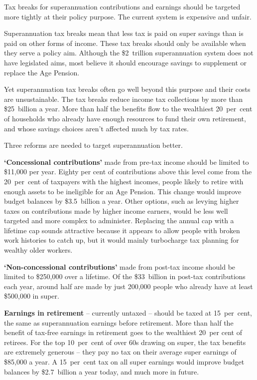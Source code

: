 

\setlength{\overviewextra}{2pt}
\addtolength{\columnsep}{\overviewextra}
\begin{overview}[-25pt]
\label{overview:SUPER}
Tax breaks for superannuation contributions and earnings should be targeted more tightly at their policy purpose. The current system is expensive and unfair. 

Superannuation tax breaks mean that less tax is paid on super savings than is paid on other forms of income. These tax breaks should only be available when they serve a policy aim. Although the \$2~trillion superannuation system does not have legislated aims, most believe it should encourage savings to supplement or replace the Age Pension. 

Yet superannuation tax breaks often go well beyond this purpose and their costs are unsustainable. The tax breaks reduce income tax collections by more than \$25~billion a year. More than half the benefits flow to the wealthiest 20~per~cent of households who already have enough resources to fund their own retirement, and whose savings choices aren’t affected much by tax rates. 

Three reforms are needed to target superannuation better.

\textbf{‘Concessional contributions’} made from pre-tax income should be limited to \$11,000 per year. Eighty per cent of contributions above this level come from the 20~per~cent of taxpayers with the highest incomes, people likely to retire with enough assets to be ineligible for an Age Pension. This change would improve budget balances by \$3.5~billion a year. Other options, such as levying higher taxes on contributions made by higher income earners, would be less well targeted and more complex to administer. Replacing the annual cap with a lifetime cap sounds attractive because it appears to allow people with broken work histories to catch up, but it would mainly turbocharge tax planning for wealthy older workers.

\textbf{‘Non-concessional contributions’} made from post-tax income
should  be limited to \$250,000 over a lifetime. Of the \$33~billion in
post-tax contributions each year, around half are made by just
200,000 people who already have at least \$500,000 in super.


\textbf{Earnings in retirement} – currently untaxed – should be taxed at 15~per~cent, the same as superannuation earnings before retirement. More than half the benefit of tax-free earnings in retirement goes to the wealthiest 20~per cent of retirees. For the top 10~per~cent of over 60s drawing on super, the tax benefits are extremely generous – they pay no tax on their average super earnings of \$85,000 a year. A 15~per~cent tax on all super earnings would improve budget balances by {\$2.7~billion} a year today, and much more in future. 


\end{overview}
